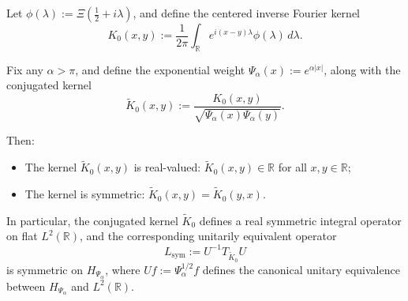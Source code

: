 \begin{lemma}
\label{lem:kernel_symmetry}
Let \( \phi(\lambda) := \Xi\left( \tfrac{1}{2} + i\lambda \right) \), and define the centered inverse Fourier kernel
\[
K_0(x,y) := \frac{1}{2\pi} \int_{\mathbb{R}} e^{i(x - y)\lambda} \phi(\lambda)\, d\lambda.
\]

Fix any \( \alpha > \pi \), and define the exponential weight \( \Psi_\alpha(x) := e^{\alpha |x|} \), along with the conjugated kernel
\[
\widetilde{K}_0(x,y) := \frac{K_0(x,y)}{\sqrt{\Psi_\alpha(x)\Psi_\alpha(y)}}.
\]

Then:
\begin{itemize}
    \item The kernel \( \widetilde{K}_0(x,y) \) is real-valued: \( \widetilde{K}_0(x,y) \in \mathbb{R} \) for all \( x, y \in \mathbb{R} \);
    \item The kernel is symmetric: \( \widetilde{K}_0(x,y) = \widetilde{K}_0(y,x) \).
\end{itemize}

\noindent
In particular, the conjugated kernel \( \widetilde{K}_0 \) defines a real symmetric integral operator on flat \( L^2(\mathbb{R}) \), and the corresponding unitarily equivalent operator
\[
L_{\mathrm{sym}} := U^{-1} T_{\widetilde{K}_0} U
\]
is symmetric on \( H_{\Psi_\alpha} \), where \( U f := \Psi_\alpha^{1/2} f \) defines the canonical unitary equivalence between \( H_{\Psi_\alpha} \) and \( L^2(\mathbb{R}) \).
\end{lemma}
